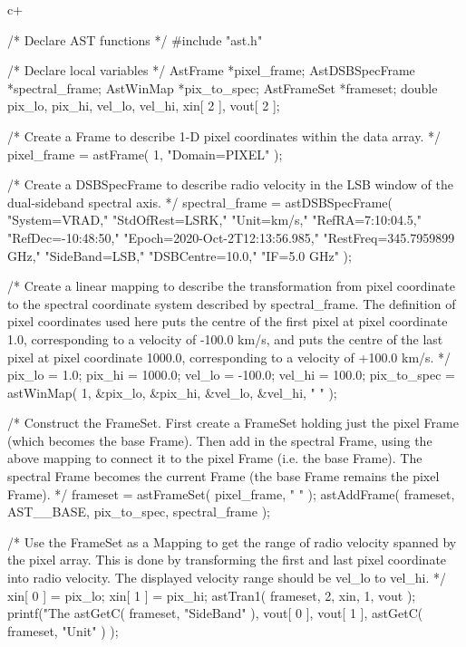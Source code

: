 \documentclass[twoside,11pt]{starlink}
\begin{document}
c+
\small
\begin{terminalv}

/* Declare AST functions */
   #include "ast.h"

/* Declare local variables */
   AstFrame *pixel_frame;
   AstDSBSpecFrame *spectral_frame;
   AstWinMap *pix_to_spec;
   AstFrameSet *frameset;
   double pix_lo, pix_hi, vel_lo, vel_hi, xin[ 2 ], vout[ 2 ];

/* Create a Frame to describe 1-D pixel coordinates within the data
   array. */
   pixel_frame = astFrame( 1, "Domain=PIXEL" );

/* Create a DSBSpecFrame to describe radio velocity in the LSB window of
   the dual-sideband spectral axis. */
   spectral_frame = astDSBSpecFrame( "System=VRAD,"
                                     "StdOfRest=LSRK,"
                                     "Unit=km/s,"
                                     "RefRA=7:10:04.5,"
                                     "RefDec=-10:48:50,"
                                     "Epoch=2020-Oct-2T12:13:56.985,"
                                     "RestFreq=345.7959899 GHz,"
                                     "SideBand=LSB,"
                                     "DSBCentre=10.0,"
                                     "IF=5.0 GHz" );

/* Create a linear mapping to describe the transformation from pixel
   coordinate to the spectral coordinate system described by spectral_frame.
   The definition of pixel coordinates used here puts the centre of the
   first pixel at pixel coordinate 1.0, corresponding to a velocity of
   -100.0 km/s, and puts the centre of the last pixel at pixel coordinate
   1000.0, corresponding to a velocity of +100.0 km/s. */
   pix_lo = 1.0;
   pix_hi = 1000.0;
   vel_lo = -100.0;
   vel_hi = 100.0;
   pix_to_spec = astWinMap( 1, &pix_lo, &pix_hi, &vel_lo, &vel_hi, " " );

/* Construct the FrameSet. First create a FrameSet holding just the pixel
   Frame (which becomes the base Frame). Then add in the spectral Frame,
   using the above mapping to connect it to the pixel Frame (i.e. the base
   Frame). The spectral Frame becomes the current Frame (the base Frame
   remains the pixel Frame). */
   frameset = astFrameSet( pixel_frame, " " );
   astAddFrame( frameset, AST__BASE, pix_to_spec, spectral_frame );

/* Use the FrameSet as a Mapping to get the range of radio velocity
   spanned by the pixel array. This is done by transforming the first and
   last pixel coordinate into radio velocity. The displayed velocity range
   should be vel_lo to vel_hi. */
   xin[ 0 ] = pix_lo;
   xin[ 1 ] = pix_hi;
   astTran1( frameset, 2, xin, 1, vout );
   printf("The %
          astGetC( frameset, "SideBand" ), vout[ 0 ], vout[ 1 ],
          astGetC( frameset, "Unit" ) );


\end{terminalv}
\end{document}
